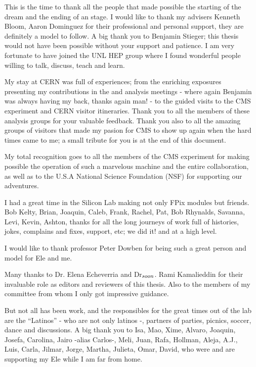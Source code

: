 
This is the time to thank all the people that made possible the starting of the dream and the ending of an stage. I would like to thank my advisers Kenneth Bloom, Aaron Dominguez for their professional and personal support, they are definitely a model to follow. A big thank you to Benjamin Stieger; this thesis would not have been possible without your support and patience. I am very fortunate to have joined the UNL HEP group where I found wonderful people willing to talk, discuss, teach and learn.

My stay at CERN was full of experiences; from the enriching exposures presenting my contributions in the \ttH and \HWW analysis meetings - where again Benjamin was always having my back, thanks again man! - to the guided visits to the CMS experiment and CERN visitor itineraries. Thank you to all the members of these analysis groups for your valuable feedback. Thank you also to all the amazing groups of visitors that made my pasion for CMS to show up again when the hard times came to me; a small tribute for you is at the end of this document.

My total recognition goes to all the members of the CMS experiment for making possible the operation of such a marvelous machine and the entire collaboration, as well as to the U.S.A National Science Foundation (NSF) for supporting our adventures. 

I had a great time in the Silicon Lab making not only FPix modules but friends. Bob Kelty, Brian, Joaquin, Caleb, Frank, Rachel, Pat, Bob Rhynalds, Savanna, Levi, Kevin, Ashton, thanks for all the long journeys of work full of histories, jokes, complains and fixes, support, etc; we did it! and at a high level.

I would like to thank professor Peter Dowben for being such a great person and model for Ele and me.

Many thanks to Dr. Elena Echeverria and Dr$_{{\footnotesize soon}}$. Rami Kamalieddin for their invaluable role as editors and reviewers of this thesis. Also to the members of my committee from whom I only got impressive guidance. 

But not all has been work, and the responsibles for the great times out of the lab are the ``Latinos'' - who are not only latinos -, partners of parties, picnics, soccer, dance and discussions. A big thank you to Isa, Mao, Xime, Alvaro, Joaquin, Josefa, Carolina, Jairo -alias Carlos-, Meli, Juan, Rafa, Hollman, Aleja, A.J., Luis, Carla, Jilmar, Jorge, Martha, Julieta, Omar, David, who were and are supporting my Ele while I am far from home. 

